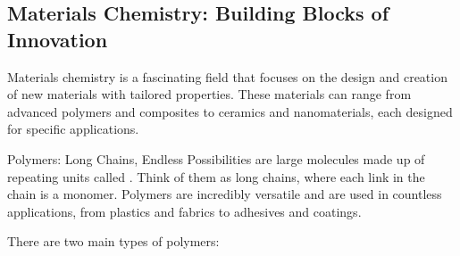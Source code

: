 \subsection{Materials Chemistry: Building Blocks of Innovation}

Materials chemistry is a fascinating field that focuses on the design and creation of new materials with tailored properties.  These materials can range from advanced polymers and composites to ceramics and nanomaterials, each designed for specific applications.

\begin{keyconcept}{Polymers: Long Chains, Endless Possibilities}
 are large molecules made up of repeating units called .  Think of them as long chains, where each link in the chain is a monomer.  Polymers are incredibly versatile and are used in countless applications, from plastics and fabrics to adhesives and coatings.

There are two main types of polymers:


\end{keyconcept}
